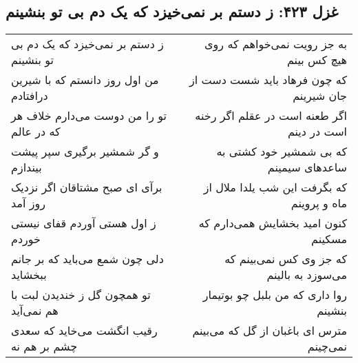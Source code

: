 \begin{center}
\section*{غزل ۴۲۳: ز دستم بر نمی‌خیزد که یک دم بی تو بنشینم}
\label{sec:423}
\begin{longtable}{l p{0.5cm} r}
ز دستم بر نمی‌خیزد که یک دم بی تو بنشینم
&&
به جز رویت نمی‌خواهم که روی هیچ کس بینم
\\
من اول روز دانستم که با شیرین درافتادم
&&
که چون فرهاد باید شست دست از جان شیرینم
\\
تو را من دوست می‌دارم خلاف هر که در عالم
&&
اگر طعنه است در عقلم اگر رخنه است در دینم
\\
و گر شمشیر برگیری سپر پیشت بیندازم
&&
که بی شمشیر خود کشتی به ساعدهای سیمینم
\\
برآی ای صبح مشتاقان اگر نزدیک روز آمد
&&
که بگرفت این شب یلدا ملال از ماه و پروینم
\\
ز اول هستی آوردم قفای نیستی خوردم
&&
کنون امید بخشایش همی‌دارم که مسکینم
\\
دلی چون شمع می‌باید که بر جانم ببخشاید
&&
که جز وی کس نمی‌بینم که می‌سوزد به بالینم
\\
تو همچون گل ز خندیدن لبت با هم نمی‌آید
&&
روا داری که من بلبل چو بوتیمار بنشینم
\\
رقیب انگشت می‌خاید که سعدی چشم بر هم نه
&&
مترس ای باغبان از گل که می‌بینم نمی‌چینم
\\
\end{longtable}
\end{center}
